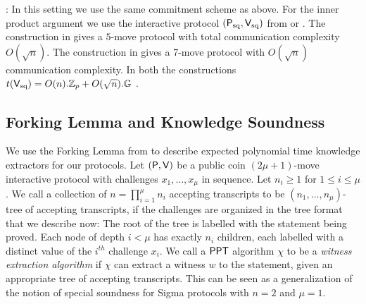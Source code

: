 : In this setting we use the same commitment scheme as above. For the inner product argument we use the interactive protocol $(\mathsf{P}_\mathrm{sq},\mathsf{V}_\mathrm{sq})$ from \cite{InnerProductDLS} or \cite{Groth09b}. The construction in \cite{InnerProductDLS} gives a $5$-move  protocol with total communication complexity $O(\sqrt{n})$. The construction in \cite{Groth09b} gives a 7-move protocol with $O(\sqrt{n})$ communication complexity. In both the constructions $t(\mathsf{V}_\mathrm{sq}) = O(n).\mathbb{Z}_p +O(\sqrt{n}).\mathbb{G}$ .

\subsection{Forking Lemma and Knowledge Soundness}
We use the Forking Lemma from \cite{InnerProductDLS,bulletproofs} to describe 
expected polynomial time knowledge extractors for our protocols. Let
$(\mathsf{P},\mathsf{V})$ be a public coin $(2\mu+1)$-move interactive protocol with
challenges $x_1,\ldots,x_\mu$ in sequence. Let $n_i\geq 1$ for $1\leq i\leq
\mu$. We call a collection of $n=\prod_{i=1}^\mu n_i$ accepting transcripts to be
$(n_1,\ldots,n_\mu)$-tree of accepting transcripts, if the challenges are
organized in the tree format that we describe now:  The root of the tree is
labelled with the statement being proved. Each node of depth $i<\mu$ has exactly
$n_i$ children, each labelled with a distinct value of the $i^{th}$ challenge
$x_i$. We call a $\mathsf{PPT}$ algorithm $\chi$ to be a {\em witness extraction
algorithm} if $\chi$ can extract a witness $w$ to the statement, given an
appropriate tree of accepting transcripts. This can be seen as a generalization
of the notion of special soundness for Sigma protocols with $n=2$ and $\mu=1$.


